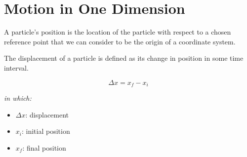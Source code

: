 \chapter{Motion in One Dimension}
                \par A particle's position is the location of the particle with respect to a
                chosen reference point that we can consider to be the origin of a
                coordinate system.
                \par The displacement of a particle is defined as its change in position in some
                time interval.
                \begin{center}
                    \begin{equation}
                        \Delta x = x_{f} - x_{i}
                    \end{equation}
                \end{center}
                \textit{in which:}
                \begin{itemize}
                    \item $\Delta x$: displacement
                    \item $x_{i}$: initial position
                    \item $x_{f}$: final position
                \end{itemize}
        \hiiEND
